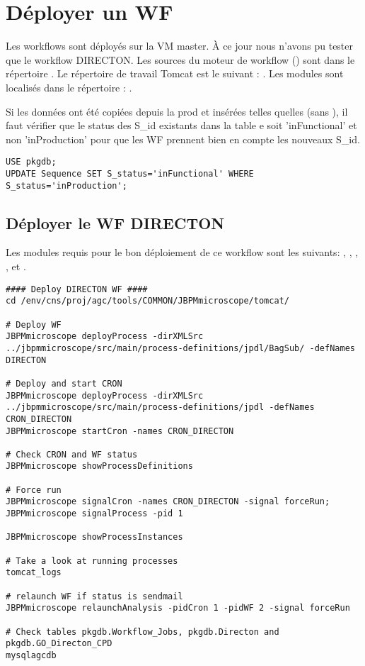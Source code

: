\section{Déployer un WF} \label{sec:deployer_wf}

Les workflows sont déployés sur la VM master.
À ce jour nous n'avons pu tester que le workflow DIRECTON.
Les sources du moteur de workflow () sont dans le répertoire .
Le répertoire de travail Tomcat est le suivant : .
Les modules sont localisés dans le répertoire : .

\begin{mycolorbox}
    Si les données ont été copiées depuis la prod et insérées telles quelles (sans ), il faut vérifier que le status des S\_id existants dans la table e soit 'inFunctional' et non 'inProduction' pour que les WF prennent bien en compte les nouveaux S\_id.
\end{mycolorbox}

\begin{lstlisting}[style=SQL]
USE pkgdb;
UPDATE Sequence SET S_status='inFunctional' WHERE S_status='inProduction';
\end{lstlisting}

\subsection{Déployer le WF DIRECTON}

Les modules requis pour le bon déploiement de ce workflow sont les suivants: , , , ,  et .

\begin{lstlisting}[style=bash]
#### Deploy DIRECTON WF ####
cd /env/cns/proj/agc/tools/COMMON/JBPMmicroscope/tomcat/

# Deploy WF
JBPMmicroscope deployProcess -dirXMLSrc ../jbpmmicroscope/src/main/process-definitions/jpdl/BagSub/ -defNames DIRECTON

# Deploy and start CRON
JBPMmicroscope deployProcess -dirXMLSrc ../jbpmmicroscope/src/main/process-definitions/jpdl -defNames CRON_DIRECTON
JBPMmicroscope startCron -names CRON_DIRECTON

# Check CRON and WF status
JBPMmicroscope showProcessDefinitions

# Force run
JBPMmicroscope signalCron -names CRON_DIRECTON -signal forceRun; JBPMmicroscope signalProcess -pid 1

JBPMmicroscope showProcessInstances

# Take a look at running processes
tomcat_logs

# relaunch WF if status is sendmail
JBPMmicroscope relaunchAnalysis -pidCron 1 -pidWF 2 -signal forceRun

# Check tables pkgdb.Workflow_Jobs, pkgdb.Directon and pkgdb.GO_Directon_CPD
mysqlagcdb
\end{lstlisting}
